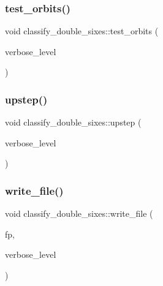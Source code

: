 \mbox{\label{classclassify__double__sixes_abbdf82332e2bd681f4afb1b21fa85bed}} 
\subsubsection{\texorpdfstring{test\+\_\+orbits()}{test\_orbits()}}
{\footnotesize\ttfamily void classify\+\_\+double\+\_\+sixes\+::test\+\_\+orbits (\begin{DoxyParamCaption}\item[{\mbox{\hyperlink{galois_8h_a09fddde158a3a20bd2dcadb609de11dc}{I\+NT}}}]{verbose\+\_\+level }\end{DoxyParamCaption})}

\mbox{\label{classclassify__double__sixes_af69579aea0c34504ccfe37a4f9d992ef}} 
\subsubsection{\texorpdfstring{upstep()}{upstep()}}
{\footnotesize\ttfamily void classify\+\_\+double\+\_\+sixes\+::upstep (\begin{DoxyParamCaption}\item[{\mbox{\hyperlink{galois_8h_a09fddde158a3a20bd2dcadb609de11dc}{I\+NT}}}]{verbose\+\_\+level }\end{DoxyParamCaption})}

\mbox{\label{classclassify__double__sixes_ac247ac1d951d9c2d11b7e0356a96c8cc}} 
\subsubsection{\texorpdfstring{write\+\_\+file()}{write\_file()}}
{\footnotesize\ttfamily void classify\+\_\+double\+\_\+sixes\+::write\+\_\+file (\begin{DoxyParamCaption}\item[{ofstream \&}]{fp,  }\item[{\mbox{\hyperlink{galois_8h_a09fddde158a3a20bd2dcadb609de11dc}{I\+NT}}}]{verbose\+\_\+level }\end{DoxyParamCaption})}




